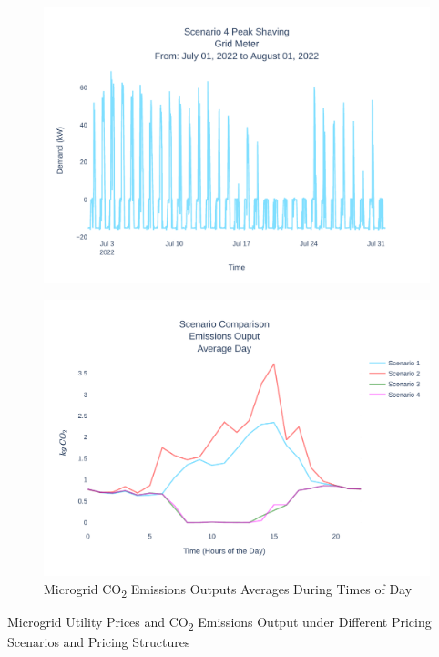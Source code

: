 \documentclass[conference]{IEEEtran}
\begin{document}
	\begin{figure}[H]
		\centering
		\includegraphics[width=1\linewidth]{Fig/scenario_4_peak_shaving}
		\caption{}
		\label{fig:scenario4peakshaving}
	\end{figure}

	\begin{figure}[H]
		\centering
		\includegraphics[width=1\linewidth]{Fig/emissions_scenario_comparison_run_2}
		\caption{Microgrid  CO\textsubscript{2} Emissions Outputs Averages During Times of Day}
		\label{fig:emissionsscenariocomparison}
	\end{figure}
	
	\begin{table}[H]
		\caption{Microgrid Utility Prices and CO\textsubscript{2} Emissions Output under Different Pricing Scenarios and Pricing Structures}
		\tiny
		\centering
		
		\normalsize
		\label{tab:emissions}
	\end{table}
\end{document}
